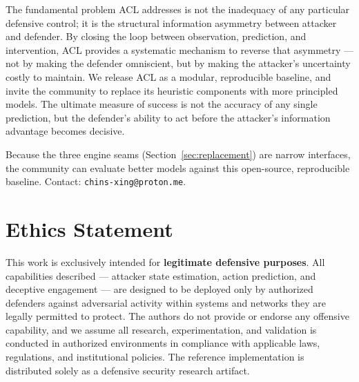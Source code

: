 \documentclass[preprints,article,accept,oneauthor]{Definitions/mdpi}
\begin{document}
The fundamental problem ACL addresses is not the inadequacy of any particular defensive control; it is the structural information asymmetry between attacker and defender. By closing the loop between observation, prediction, and intervention, ACL provides a systematic mechanism to reverse that asymmetry --- not by making the defender omniscient, but by making the attacker's uncertainty costly to maintain. We release ACL as a modular, reproducible baseline, and invite the community to replace its heuristic components with more principled models. The ultimate measure of success is not the accuracy of any single prediction, but the defender's ability to act before the attacker's information advantage becomes decisive.

Because the three engine seams (Section~\ref{sec:replacement}) are narrow interfaces, the community can evaluate better models against this open-source, reproducible baseline. Contact: \texttt{chins-xing@proton.me}.

\section*{Ethics Statement}

This work is exclusively intended for \textbf{legitimate defensive
purposes}. All capabilities described --- attacker state estimation, action
prediction, and deceptive engagement --- are designed to be deployed only by
authorized defenders against adversarial activity within systems and
networks they are legally permitted to protect. The authors do not provide
or endorse any offensive capability, and we assume all research,
experimentation, and validation is conducted in authorized environments in
compliance with applicable laws, regulations, and institutional policies.
The reference implementation is distributed solely as a defensive security
research artifact.



\end{document}

